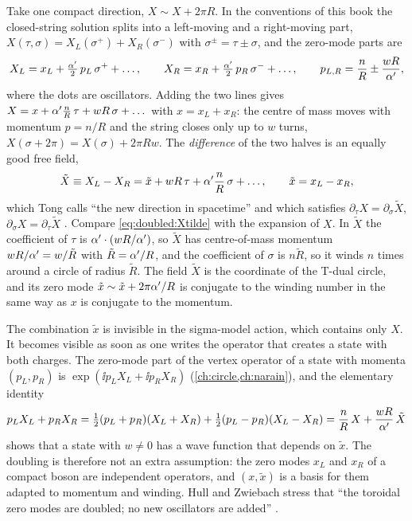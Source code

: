 Take one compact direction, $X\sim X+2\pi R$. In the conventions of this book the closed-string
solution splits into a left-moving and a right-moving part, $X(\tau,\sigma)=X_L(\sigma^+)+
X_R(\sigma^-)$ with $\sigma^\pm=\tau\pm\sigma$, and the zero-mode parts are
\begin{equation}\label{eq:doubled:XLXR}
X_L=x_L+\tfrac{\alpha'}{2}\,p_L\,\sigma^+ +\dots,\qquad
X_R=x_R+\tfrac{\alpha'}{2}\,p_R\,\sigma^- +\dots,\qquad
p_{L,R}=\frac nR\pm\frac{wR}{\alpha'},
\end{equation}
where the dots are oscillators. Adding the two lines gives
$X=x+\alpha'\frac nR\,\tau+wR\,\sigma+\dots$ with $x=x_L+x_R$: the centre of mass moves with momentum
$p=n/R$ and the string closes only up to $w$ turns, $X(\sigma+2\pi)=X(\sigma)+2\pi Rw$. The
\emph{difference} of the two halves is an equally good free field,
\begin{equation}\label{eq:doubled:Xtilde}
\tilde X\equiv X_L-X_R=\tilde x+wR\,\tau+\alpha'\frac nR\,\sigma+\dots,\qquad \tilde x=x_L-x_R ,
\end{equation}
%
which Tong calls ``the new direction in spacetime'' and which satisfies $\partial_\tau X=
\partial_\sigma\tilde X$, $\partial_\sigma X=\partial_\tau\tilde X$ . Compare \eqref{eq:doubled:Xtilde} with the expansion of $X$. In $\tilde X$
the coefficient of $\tau$ is $\alpha'\cdot(wR/\alpha')$, so $\tilde X$ has centre-of-mass momentum
$wR/\alpha'=w/\tilde R$ with $\tilde R=\alpha'/R$, and the coefficient of $\sigma$ is $n\tilde R$, so it
winds $n$ times around a circle of radius $\tilde R$. The field $\tilde X$ is the coordinate of
the T-dual circle, and its zero mode $\tilde x\sim\tilde x+2\pi\alpha'/R$ is conjugate to the winding
number in the same way as $x$ is conjugate to the momentum.

The combination $\tilde x$ is invisible in the sigma-model action, which contains only $X$. It
becomes visible as soon as one writes the operator that creates a state with both charges. The
zero-mode part of the vertex operator of a state with momenta $(p_L,p_R)$ is
$\exp(\ii p_LX_L+\ii p_RX_R)$ (\cref{ch:circle,ch:narain}), and the elementary
identity
\begin{equation}\label{eq:doubled:vertex}
p_LX_L+p_RX_R=\tfrac12(p_L+p_R)(X_L+X_R)+\tfrac12(p_L-p_R)(X_L-X_R)
=\frac nR\,X+\frac{wR}{\alpha'}\,\tilde X
\end{equation}
shows that a state with $w\neq0$ has a wave function that depends on $\tilde x$. The doubling
is therefore not an extra assumption: the zero modes $x_L$ and $x_R$ of a compact boson are
independent operators, and $(x,\tilde x)$ is a basis for them adapted to momentum and winding.
Hull and Zwiebach stress that ``the toroidal zero modes are doubled; no new oscillators are
added'' .

